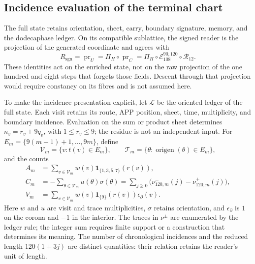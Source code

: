 \subsection{Incidence evaluation of the terminal chart}
\label{subsec:k-incidencias-residentes}

The full state retains orientation, sheet, carry, boundary signature,
memory, and the dodecaphase ledger. On its compatible sublattice, the signed
reader is the projection of the generated coordinate and agrees with
\[
 R_{\mathrm{sgn}}=\operatorname{pr}_{U}
 =\Pi_H\circ\operatorname{pr}_{C}
 =\Pi_H\circ\mathcal E_{108}^{90,120}\circ\mathcal R_{12}.
\]
These identities act on the enriched state, not on the raw projection of
the one hundred and eight steps that forgets those fields. Descent through
that projection would require constancy on its fibres and is not assumed here.

To make the incidence presentation explicit, let \(\mathscr L\) be the
oriented ledger of the full state. Each visit retains its route, APP
position, sheet, time, multiplicity, and boundary incidence. Evaluation
on the sum or product sheet determines \(n_v=r_v+9q_v\), with
\(1\leq r_v\leq9\); the residue is not an independent input. For
\(E_m=\{9(m-1)+1,\ldots,9m\}\), define
\[
 \mathscr V_m=\{v:t(v)\in E_m\},\qquad
 \mathscr T_m=\{\theta:\operatorname{origen}(\theta)\in E_m\},
\]
and the counts
\[
\begin{aligned}
 A_m&=\sum_{v\in\mathscr V_m}w(v)\mathbf1_{\{1,3,5,7\}}(r(v)),\\
 C_m&=-\sum_{\theta\in\mathscr T_m}u(\theta)\sigma(\theta)
     =\sum_{j\geq0}\bigl(\nu^-_{120,m}(j)-\nu^+_{120,m}(j)\bigr),\\
 V_m&=\sum_{v\in\mathscr V_m}w(v)\mathbf1_{\{9\}}(r(v))
                         \epsilon_\partial(v).
\end{aligned}
\]
Here \(w\) and \(u\) are visit and trace multiplicities,
\(\sigma\) retains orientation, and \(\epsilon_\partial\) is \(1\) on
the corona and \(-1\) in the interior. The traces in \(\nu^\pm\) are
enumerated by the ledger rule; the integer sum requires finite support or
a construction that determines its meaning. The number of chronological
incidences and the reduced length \(120(1+3j)\) are distinct quantities:
their relation retains the reader's unit of length.

